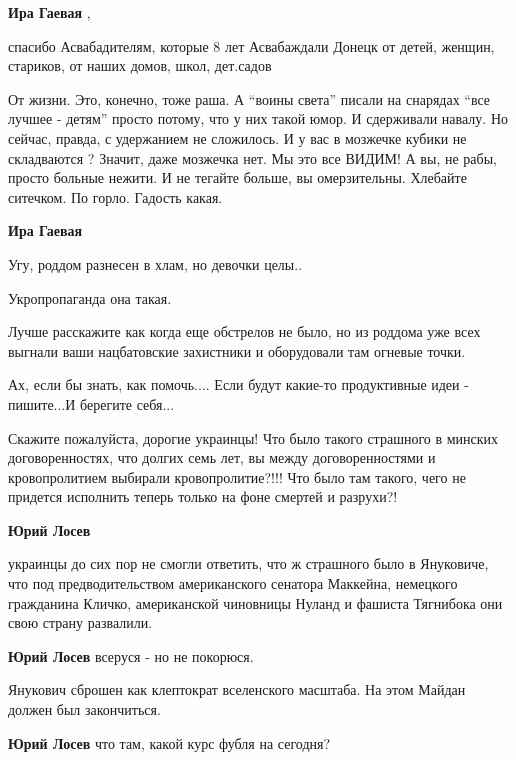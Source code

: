 \begin{itemize}
\begin{itemize}
\textbf{Ира Гаевая} , 

спасибо Асвабадителям, которые 8 лет Асвабаждали Донецк от детей, женщин,
стариков, от наших домов, школ, дет.садов

От жизни. Это, конечно, тоже раша. А \enquote{воины света} писали на снарядах \enquote{все
лучшее - детям} просто потому, что у них такой юмор. И сдерживали навалу. Но
сейчас, правда, с удержанием не сложилось. И у вас в мозжечке кубики не
складваются ? Значит, даже мозжечка нет. Мы это все ВИДИМ! А вы, не рабы,
просто больные нежити. И не тегайте больше, вы омерзительны. Хлебайте ситечком.
По горло. Гадость какая.

\textbf{Ира Гаевая}

Угу, роддом разнесен в хлам, но девочки целы..

Укропропаганда она такая.

Лучше расскажите как когда еще обстрелов не было, но из роддома уже всех
выгнали ваши нацбатовские захистники и оборудовали там огневые точки.

\end{itemize} %

Ах, если бы знать, как помочь.... Если будут какие-то продуктивные идеи - пишите...И берегите себя...


Скажите пожалуйста, дорогие украинцы! Что было такого страшного в минских
договоренностях, что долгих семь лет, вы между договоренностями и
кровопролитием выбирали кровопролитие?!!! Что было там такого, чего не придется
исполнить теперь только на фоне смертей и разрухи?!

\begin{itemize} %
\textbf{Юрий Лосев} 

украинцы до сих пор не смогли ответить, что ж страшного было в Януковиче, что
под предводительством американского сенатора Маккейна, немецкого гражданина
Кличко, американской чиновницы Нуланд и фашиста Тягнибока они свою страну
развалили.

\textbf{Юрий Лосев} всеруся - но не покорюся.

Янукович сброшен как клептократ вселенского масштаба. На этом Майдан должен был закончиться.

\textbf{Юрий Лосев} что там, какой курс фубля на сегодня?



\end{itemize}
\end{itemize}
